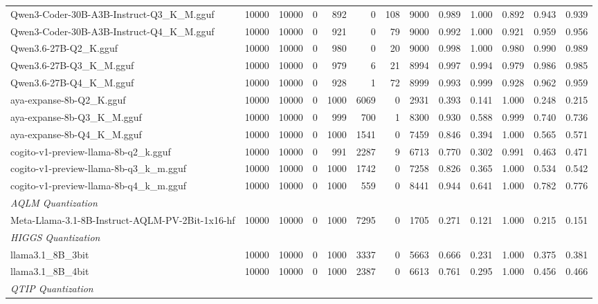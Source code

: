 \begin{table}[htbp]
{\begin{tabular}{lrrrrrrrrrrrr}
    Qwen3-Coder-30B-A3B-Instruct-Q3\_K\_M.gguf & 10000 & 10000 & 0 & 892 & 0 & 108 & 9000 & 0.989 & 1.000 & 0.892 & 0.943 & 0.939 \\
    Qwen3-Coder-30B-A3B-Instruct-Q4\_K\_M.gguf & 10000 & 10000 & 0 & 921 & 0 & 79 & 9000 & 0.992 & 1.000 & 0.921 & 0.959 & 0.956 \\
    Qwen3.6-27B-Q2\_K.gguf & 10000 & 10000 & 0 & 980 & 0 & 20 & 9000 & 0.998 & 1.000 & 0.980 & 0.990 & 0.989 \\
    Qwen3.6-27B-Q3\_K\_M.gguf & 10000 & 10000 & 0 & 979 & 6 & 21 & 8994 & 0.997 & 0.994 & 0.979 & 0.986 & 0.985 \\
    Qwen3.6-27B-Q4\_K\_M.gguf & 10000 & 10000 & 0 & 928 & 1 & 72 & 8999 & 0.993 & 0.999 & 0.928 & 0.962 & 0.959 \\
    aya-expanse-8b-Q2\_K.gguf & 10000 & 10000 & 0 & 1000 & 6069 & 0 & 2931 & 0.393 & 0.141 & 1.000 & 0.248 & 0.215 \\
    aya-expanse-8b-Q3\_K\_M.gguf & 10000 & 10000 & 0 & 999 & 700 & 1 & 8300 & 0.930 & 0.588 & 0.999 & 0.740 & 0.736 \\
    aya-expanse-8b-Q4\_K\_M.gguf & 10000 & 10000 & 0 & 1000 & 1541 & 0 & 7459 & 0.846 & 0.394 & 1.000 & 0.565 & 0.571 \\
    cogito-v1-preview-llama-8b-q2\_k.gguf & 10000 & 10000 & 0 & 991 & 2287 & 9 & 6713 & 0.770 & 0.302 & 0.991 & 0.463 & 0.471 \\
    cogito-v1-preview-llama-8b-q3\_k\_m.gguf & 10000 & 10000 & 0 & 1000 & 1742 & 0 & 7258 & 0.826 & 0.365 & 1.000 & 0.534 & 0.542 \\
    cogito-v1-preview-llama-8b-q4\_k\_m.gguf & 10000 & 10000 & 0 & 1000 & 559 & 0 & 8441 & 0.944 & 0.641 & 1.000 & 0.782 & 0.776 \\
    \midrule
    \multicolumn{13}{l}{\textit{AQLM Quantization}} \\
    \midrule
    Meta-Llama-3.1-8B-Instruct-AQLM-PV-2Bit-1x16-hf & 10000 & 10000 & 0 & 1000 & 7295 & 0 & 1705 & 0.271 & 0.121 & 1.000 & 0.215 & 0.151 \\
    \midrule
    \multicolumn{13}{l}{\textit{HIGGS Quantization}} \\
    \midrule
    llama3.1\_8B\_3bit & 10000 & 10000 & 0 & 1000 & 3337 & 0 & 5663 & 0.666 & 0.231 & 1.000 & 0.375 & 0.381 \\
    llama3.1\_8B\_4bit & 10000 & 10000 & 0 & 1000 & 2387 & 0 & 6613 & 0.761 & 0.295 & 1.000 & 0.456 & 0.466 \\
    \midrule
    \multicolumn{13}{l}{\textit{QTIP Quantization}} \\

\end{tabular}}
\end{table}
